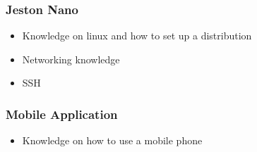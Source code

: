 \subsubsection{Jeston Nano}
\begin{itemize}
    \item Knowledge on linux and how to set up a distribution
    \item Networking knowledge
    \item SSH
\end{itemize}
\subsubsection{Mobile Application}
\begin{itemize}
    \item Knowledge on how to use a mobile phone
\end{itemize}
